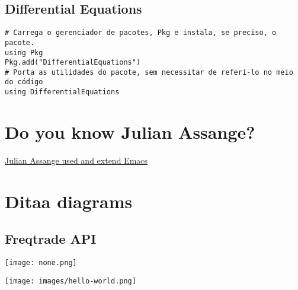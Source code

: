 \documentclass[11pt]{article}
\begin{document}
\subsection{Differential Equations}
\label{sec:org73e3a04}
\begin{verbatim}
# Carrega o gerenciador de pacotes, Pkg e instala, se preciso, o pacote.
using Pkg
Pkg.add("DifferentialEquations")
# Porta as utilidades do pacote, sem necessitar de referí-lo no meio do código
using DifferentialEquations
\end{verbatim}

\section{Do you know Julian Assange?}
\label{sec:org316a371}
\href{file:///usr/share/emacs/27.2/lisp/windmove.el.gz}{Julian Assange used and extend Emacs}

\section{Ditaa diagrams}
\label{sec:orgbef9d21}
\subsection{Freqtrade API}
\label{sec:org30702cc}
\begin{center}
\texttt{[image: none.png]}
\end{center}

\begin{center}
\texttt{[image: images/hello-world.png]}
\end{center}
\end{document}
